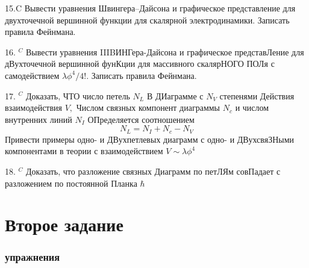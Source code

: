 \documentclass[a4paper,12pt]{article} %
\begin{document}
\begin{ttask}

15.C Вывести уравнения Швингера–Дайсона и графическое представление для двухточечной вершинной функции для скалярной электродинамики. Записать правила Фейнмана. 



\end{ttask}



\begin{ttask}

16. $^{C}$ Вывести уравнения IIIBИНГера-Дайсона и графическое представЛение для дВухточечной вершинной фунКции для массивного скалярНОГО ПОЛя с самодействием $\lambda \phi^{4} / 4 ! .$ Записать правила Фейнмана.


\end{ttask}



\begin{ttask}

17. $^{C}$ Доказать, ЧТО число петель $N_{L}$ В ДИаграмме с $N_{V}$ степенями Действия взаимодействия $V,$ Числом связных компонент диаграммы $N_{c}$ и числом внутренних линий $N_{I}$ ОПределяется соотношением
$$
N_{L}=N_{I}+N_{c}-N_{V}
$$
Привести примеры одно- и ДВухпетлевых диаграмм с одно- и ДВухсвяЗНыми компонентами в теории с взаимодействием $V \sim \lambda \phi^{4}$


\end{ttask}



\begin{ttask}


18. $^{C}$ Доказать, что разложение связных Диаграмм по петЛЯм совПадает с разложением по постоянной Планка $\hbar$

\end{ttask}













\clearpage
\part{Второе задание}


\section{упражнения}
\end{document}
